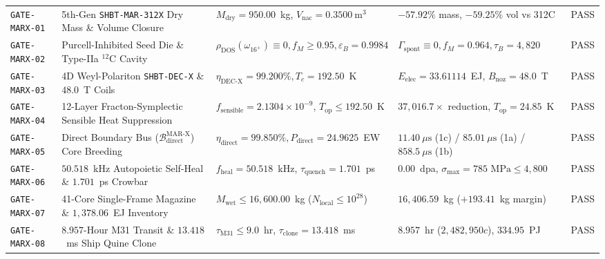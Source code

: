 \documentclass[11pt,onecolumn]{article}
\begin{document}
\begin{table}[!htbp]
\begin{tabularx}{\textwidth}{@{}l p{4.4cm} p{3.2cm} X l@{}}
\midrule
\texttt{GATE-MARX-01} & 5th-Gen \texttt{SHBT-MAR-312X} Dry Mass \& Volume Closure & $M_{\text{dry}} = 950.00$~kg, $V_{\text{nac}} = 0.3500~\mathrm{m}^3$ & $-57.92\%$ mass, $-59.25\%$ vol vs 312C & PASS \\
\texttt{GATE-MARX-02} & Purcell-Inhibited Seed Die \& Type-IIa $^{12}\text{C}$ Cavity & $\rho_{\text{DOS}}(\omega_{16^+}) \equiv 0, f_M \ge 0.95, \varepsilon_B = 0.9984$ & $\Gamma_{\text{spont}} \equiv 0, f_M = 0.964, \tau_B = 4{,}820$ & PASS \\
\texttt{GATE-MARX-03} & 4D Weyl-Polariton \texttt{SHBT-DEC-X} \& $48.0$~T Coils & $\eta_{\text{DEC-X}} = 99.200\%, T_c = 192.50$~K & $E_{\text{elec}} = 33.61114$~EJ, $B_{\text{noz}} = 48.0$~T & PASS \\
\texttt{GATE-MARX-04} & 12-Layer Fracton-Symplectic Sensible Heat Suppression & $f_{\text{sensible}} = 2.1304\times 10^{-9}$, $T_{\text{op}} \le 192.50$~K & $37{,}016.7\times$ reduction, $T_{\text{op}} = 24.85$~K & PASS \\
\texttt{GATE-MARX-05} & Direct Boundary Bus ($\mathcal{B}_{\text{direct}}^{\text{MAR-X}}$) Core Breeding & $\eta_{\text{direct}} = 99.850\%, P_{\text{direct}} = 24.9625$~EW & $11.40~\mu\text{s}$ (1c) / $85.01~\mu\text{s}$ (1a) / $858.5~\mu\text{s}$ (1b) & PASS \\
\texttt{GATE-MARX-06} & $50.518$~kHz Autopoietic Self-Heal \& $1.701$~ps Crowbar & $f_{\text{heal}} = 50.518$~kHz, $\tau_{\text{quench}} = 1.701$~ps & $0.00$~dpa, $\sigma_{\max} = 785\text{ MPa} \le 4{,}800$ & PASS \\
\texttt{GATE-MARX-07} & 41-Core Single-Frame Magazine \& $1{,}378.06$~EJ Inventory & $M_{\text{wet}} \le 16{,}600.00$~kg ($N_{\text{local}} \le 10^{28}$) & $16{,}406.59$~kg ($+193.41$~kg margin) & PASS \\
\texttt{GATE-MARX-08} & $8.957$-Hour M31 Transit \& $13.418$~ms Ship Quine Clone & $\tau_{\text{M31}} \le 9.0$~hr, $\tau_{\text{clone}} = 13.418$~ms & $8.957$~hr ($2{,}482{,}950c$), $334.95$~PJ & PASS \\
\bottomrule
\end{tabularx}
\end{table}
\end{document}
